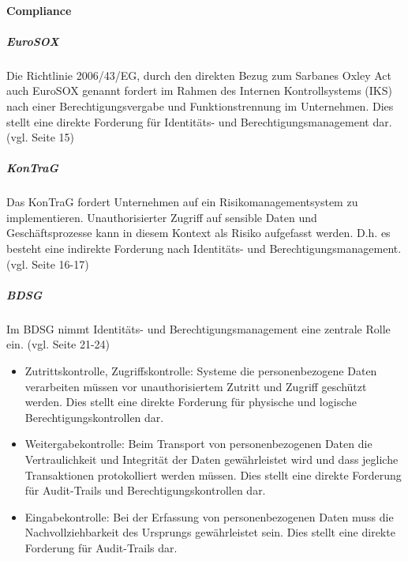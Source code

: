 \documentclass[11pt]{article}
\begin{document}
\paragraph{Compliance}
\subparagraph{EuroSOX}
Die Richtlinie 2006/43/EG, durch den direkten Bezug zum Sarbanes Oxley Act auch EuroSOX genannt fordert im Rahmen des Internen Kontrollsystems (IKS) nach einer Berechtigungsvergabe und Funktionstrennung im Unternehmen. Dies stellt eine direkte Forderung für Identitäts- und Berechtigungsmanagement dar. (vgl. \cite{conta2017leitfaden} Seite 15)
\subparagraph{KonTraG}
Das KonTraG fordert Unternehmen auf ein Risikomanagementsystem zu implementieren. Unauthorisierter Zugriff auf sensible Daten und Geschäftsprozesse kann in diesem Kontext als Risiko aufgefasst werden. D.h. es besteht eine indirekte Forderung nach Identitäts- und Berechtigungsmanagement. (vgl. \cite{conta2017leitfaden} Seite 16-17)
\subparagraph{BDSG}
Im BDSG nimmt Identitäts- und Berechtigungsmanagement eine zentrale Rolle ein. (vgl. \cite{conta2017leitfaden} Seite 21-24)
\begin{itemize}
  \item Zutrittskontrolle, Zugriffskontrolle: Systeme die personenbezogene Daten verarbeiten müssen vor unauthorisiertem Zutritt und Zugriff geschützt werden. Dies stellt eine direkte Forderung für physische und logische Berechtigungskontrollen dar.
  \item Weitergabekontrolle: Beim Transport von personenbezogenen Daten die Vertraulichkeit und Integrität der Daten gewährleistet wird und dass jegliche Transaktionen protokolliert werden müssen. Dies stellt eine direkte Forderung für Audit-Trails und Berechtigungskontrollen dar.
  \item Eingabekontrolle: Bei der Erfassung von personenbezogenen Daten muss die Nachvollziehbarkeit des Ursprungs gewährleistet sein. Dies stellt eine direkte Forderung für Audit-Trails dar.
\end{itemize}
\end{document}
